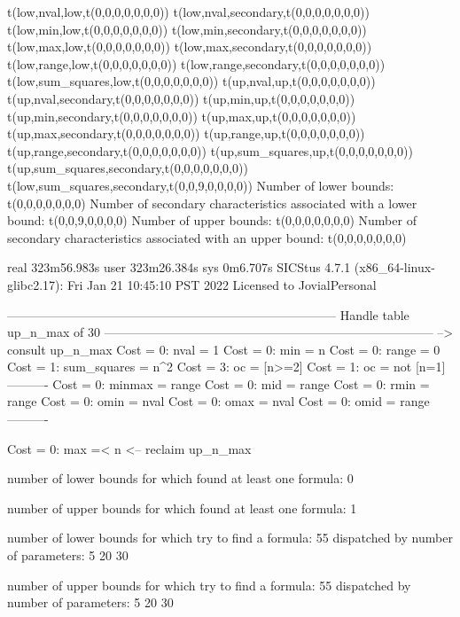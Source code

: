 t(low,nval,low,t(0,0,0,0,0,0,0))
t(low,nval,secondary,t(0,0,0,0,0,0,0))
t(low,min,low,t(0,0,0,0,0,0,0))
t(low,min,secondary,t(0,0,0,0,0,0,0))
t(low,max,low,t(0,0,0,0,0,0,0))
t(low,max,secondary,t(0,0,0,0,0,0,0))
t(low,range,low,t(0,0,0,0,0,0,0))
t(low,range,secondary,t(0,0,0,0,0,0,0))
t(low,sum_squares,low,t(0,0,0,0,0,0,0))
t(up,nval,up,t(0,0,0,0,0,0,0))
t(up,nval,secondary,t(0,0,0,0,0,0,0))
t(up,min,up,t(0,0,0,0,0,0,0))
t(up,min,secondary,t(0,0,0,0,0,0,0))
t(up,max,up,t(0,0,0,0,0,0,0))
t(up,max,secondary,t(0,0,0,0,0,0,0))
t(up,range,up,t(0,0,0,0,0,0,0))
t(up,range,secondary,t(0,0,0,0,0,0,0))
t(up,sum_squares,up,t(0,0,0,0,0,0,0))
t(up,sum_squares,secondary,t(0,0,0,0,0,0,0))
t(low,sum_squares,secondary,t(0,0,9,0,0,0,0))
Number of lower bounds:                                             t(0,0,0,0,0,0,0)
Number of secondary characteristics associated with a lower bound:  t(0,0,9,0,0,0,0)
Number of upper bounds:                                             t(0,0,0,0,0,0,0)
Number of secondary characteristics associated with an upper bound: t(0,0,0,0,0,0,0)

real	323m56.983s
user	323m26.384s
sys	0m6.707s
SICStus 4.7.1 (x86_64-linux-glibc2.17): Fri Jan 21 10:45:10 PST 2022
Licensed to JovialPersonal


--------------------------------------------------------------------------------
Handle table up_n_max of 30
--------------------------------------------------------------------------------
--> consult up_n_max
Cost =  0:  nval        = 1
Cost =  0:  min         = n
Cost =  0:  range       = 0
Cost =  1:  sum_squares = n^2
Cost =  3:  oc          = [n>=2]
Cost =  1:  oc          = not [n=1]
----------
Cost =  0:  minmax      = range
Cost =  0:  mid         = range
Cost =  0:  rmin        = range
Cost =  0:  omin        = nval
Cost =  0:  omax        = nval
Cost =  0:  omid        = range
----------

Cost =  0:  max =< n
<-- reclaim up_n_max

number of lower bounds for which found at least one formula: 0

number of upper bounds for which found at least one formula: 1

number of lower bounds for which try to find a formula: 55
dispatched by number of parameters: 5  20  30

number of upper bounds for which try to find a formula: 55
dispatched by number of parameters: 5  20  30

